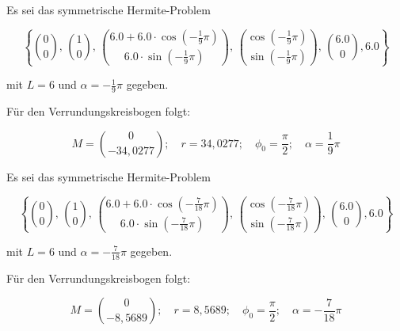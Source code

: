 \BEISPIEL
{
  Es sei das symmetrische Hermite-Problem 
  
  $$\left\{\binom{0}{0},\, \binom{1}{0},\,
  \binom{6.0+6.0\cdot \cos\left(-\frac{1}{9}\pi\right)}{6.0\cdot \sin\left(-\frac{1}{9}\pi\right)},\, \binom{\cos\left(-\frac{1}{9}\pi\right)}{\sin\left(-\frac{1}{9}\pi\right)},\, \binom{6.0}{0},6.0\right\}$$
  
  mit $L=6$ und $\alpha=-\frac{1}{9}\pi$ gegeben.
  
  Für den Verrundungskreisbogen folgt:
  
  $$M=\binom{0}{-34,0277}; \quad r=34,0277;\quad \phi_0 = \frac{\pi}{2}; \quad \alpha=\frac{1}{9}\pi$$
  
  
  \begin{center}
  \end{center}
}



\BEISPIEL
{
  Es sei das symmetrische Hermite-Problem 
  
  $$\left\{\binom{0}{0},\, \binom{1}{0},\,
  \binom{6.0+6.0\cdot \cos\left(-\frac{7}{18}\pi\right)}{6.0\cdot \sin\left(-\frac{7}{18}\pi\right)},\, \binom{\cos\left(-\frac{7}{18}\pi\right)}{\sin\left(-\frac{7}{18}\pi\right)},\, \binom{6.0}{0},6.0\right\}$$
  
  mit $L=6$ und $\alpha=-\frac{7}{18}\pi$ gegeben.
  
  Für den Verrundungskreisbogen folgt:
  
  $$M=\binom{0}{-8,5689}; \quad r=8,5689;\quad \phi_0 = \frac{\pi}{2}; \quad \alpha=-\frac{7}{18}\pi$$
  
  
  \begin{center}
  \end{center}
}


